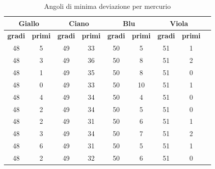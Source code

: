 \documentclass[letterpaper,12pt]{article}
\begin{document}
\begin{table}[h!]
    \centering
    \begin{tabular}{|c|c|c|c|c|c|c|c|c|}
    \hline
    \multicolumn{2}{|c|}{\textbf{Giallo}} & \multicolumn{2}{|c|}{\textbf{Ciano}} & \multicolumn{2}{|c|}{\textbf{Blu}} & \multicolumn{2}{|c|}{\textbf{Viola}} \\
    \hline
    \textbf{gradi} & \textbf{primi} & \textbf{gradi} & \textbf{primi} & \textbf{gradi} & \textbf{primi} & \textbf{gradi} & \textbf{primi} \\
    \hline
    48 & 5 & 49 & 33 & 50 & 5 & 51 & 1 \\
    48 & 3 & 49 & 36 & 50 & 8 & 51 & 2 \\
    48 & 1 & 49 & 35 & 50 & 8 & 51 & 0 \\
    48 & 0 & 49 & 33 & 50 & 10 & 51 & 1 \\
    48 & 4 & 49 & 34 & 50 & 4 & 51 & 0 \\
    48 & 2 & 49 & 34 & 50 & 5 & 51 & 0 \\
    48 & 2 & 49 & 31 & 50 & 6 & 51 & 1 \\
    48 & 3 & 49 & 34 & 50 & 7 & 51 & 2 \\
    48 & 6 & 49 & 31 & 50 & 5 & 51 & 1 \\
    48 & 2 & 49 & 32 & 50 & 6 & 51 & 0 \\
    \hline
    \end{tabular}
    \caption{Angoli di minima deviazione per mercurio}
    \label{tab:prisma_md}
    \end{table}
\end{document}
